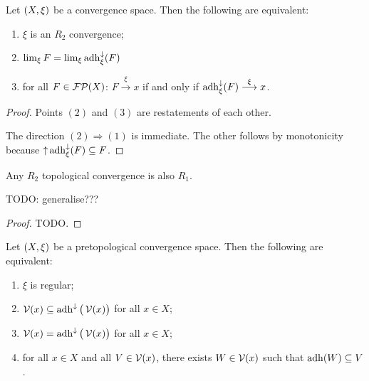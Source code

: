 \begin{lemma}
Let $\sSet{X,\xi}$ be a convergence space. Then the following are equivalent:
\begin{enumerate}
\item $\xi$ is an $R_2$ convergence;
\item $\lim_\xi F = \lim_\xi \operatorname{adh}_\xi^\downarrow(F)$
\item for all $F\in\operatorname{\mathcal{FP}}(X)$: $F\overset{\xi}{\longrightarrow} x$ \textup{if and only if} $\operatorname{adh}_\xi^\downarrow(F) \overset{\xi}{\longrightarrow} x$.
\end{enumerate}
\end{lemma}
\begin{proof}
Points $(2)$ and $(3)$ are restatements of each other.

The direction $(2)\Rightarrow (1)$ is immediate. The other follows by monotonicity because $\operatorname{\uparrow} \operatorname{adh}_\xi^\downarrow(F) \subseteq F$.
\end{proof}

\begin{proposition}
Any $R_2$ topological convergence is also $R_1$.
\end{proposition}
TODO: generalise???
\begin{proof}
TODO.
\end{proof}

\begin{lemma}
Let $\sSet{X, \xi}$ be a pretopological convergence space. Then the following are equivalent:
\begin{enumerate}
\item $\xi$ is regular;
\item $\operatorname{\mathcal{V}}(x) \subseteq \operatorname{adh}^\downarrow\big(\operatorname{\mathcal{V}}(x)\big)$ for all $x\in X$;
\item $\operatorname{\mathcal{V}}(x) = \operatorname{adh}^\downarrow\big(\operatorname{\mathcal{V}}(x)\big)$ for all $x\in X$;
\item for all $x\in X$ and all $V\in \operatorname{\mathcal{V}}(x)$, there exists $W\in \operatorname{\mathcal{V}}(x)$ such that $\operatorname{adh}(W) \subseteq V$.
\end{enumerate}
\end{lemma}


